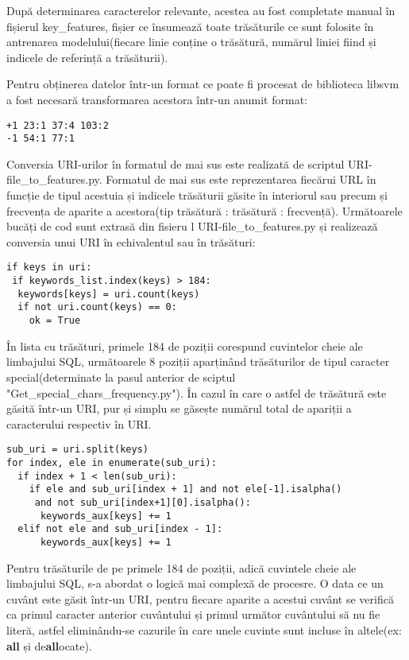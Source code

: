 După determinarea caracterelor relevante, acestea au fost completate manual în fișierul key\_features, fișier ce însumează toate trăsăturile ce sunt folosite în antrenarea modelului(fiecare linie conține o trăsătură, numărul liniei fiind și indicele de referință a trăsăturii). 

Pentru obținerea datelor într-un format ce poate fi procesat de biblioteca libsvm \cite{libsvm} a fost necesară transformarea acestora într-un anumit format: 

\begin{lstlisting}
+1 23:1 37:4 103:2
-1 54:1 77:1
\end{lstlisting}

Conversia URI-urilor în formatul de mai sus este realizată de scriptul  URI-file\_to\_features.py.  Formatul de mai sus este reprezentarea fiecărui URL în funcție de tipul acestuia și indicele trăsăturii găsite în interiorul sau precum și frecvența de aparite a acestora(tip trăsătură : trăsătură : frecvență). Următoarele bucăți de cod sunt extrasă din fisieru l URI-file\_to\_features.py  și realizează conversia unui URI în echivalentul sau în trăsături: 

\begin{lstlisting}
if keys in uri:
 if keywords_list.index(keys) > 184:
  keywords[keys] = uri.count(keys)
  if not uri.count(keys) == 0:
    ok = True
\end{lstlisting}

În lista cu trăsături, primele 184 de poziții corespund cuvintelor cheie ale limbajului SQL, următoarele 8 poziții aparținând trăsăturilor de tipul caracter special(determinate la pasul anterior de sciptul "Get\_special\_chars\_frequency.py"). În cazul în care o astfel de trăsătură este găsită într-un URI, pur și simplu se găsește numărul total de apariții a caracterului respectiv în URI. 


\begin{lstlisting}
sub_uri = uri.split(keys)
for index, ele in enumerate(sub_uri):
  if index + 1 < len(sub_uri):
    if ele and sub_uri[index + 1] and not ele[-1].isalpha()
     and not sub_uri[index+1][0].isalpha():
      keywords_aux[keys] += 1
  elif not ele and sub_uri[index - 1]:
      keywords_aux[keys] += 1
\end{lstlisting}

Pentru trăsăturile de pe primele 184 de poziții, adică cuvintele cheie ale limbajului SQL, s-a abordat o logică mai complexă de procesre. O data ce un cuvânt este găsit într-un URI, pentru fiecare aparite a acestui cuvânt se verifică ca primul caracter anterior cuvântului și primul următor cuvântului să nu fie literă, astfel eliminându-se cazurile în care unele cuvinte sunt incluse în altele(ex:  \textbf{all} și de\textbf{all}ocate).

